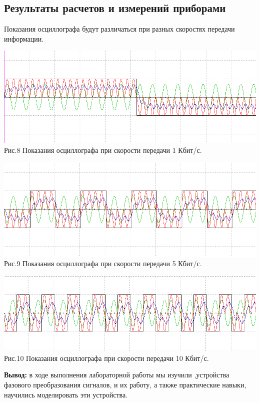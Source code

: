 \documentclass[11pt]{article}
\begin{document}
\subsection{Результаты расчетов и измерений приборами}
Показания осциллографа будут различаться при разных скоростях передачи информации.
\begin{center}
    \includegraphics[width=1\linewidth]{img/osc31.png}
        Рис.8 Показания осциллографа при скорости передачи 1 Кбит/с.
\end{center}

\begin{center}
    \includegraphics[width=1\linewidth]{img/osc32.png}
        Рис.9 Показания осциллографа при скорости передачи 5 Кбит/с.
\end{center}
\begin{center}
    \includegraphics[width=1\linewidth]{img/osc33.png}
        Рис.10 Показания осциллографа при скорости передачи 10 Кбит/с.
\end{center}

\textbf{Вывод:} в ходе выполнения лабораторной работы мы изучили ,устройства фазового преобразования сигналов, и их работу, а также практические навыки, научились моделировать эти устройства.
\end{document}
